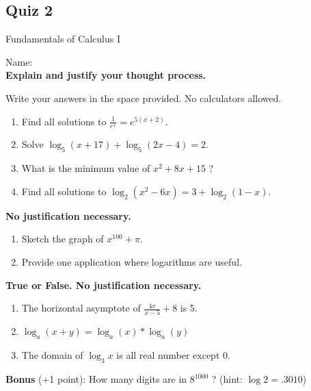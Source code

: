 \documentclass[a4paper, 12pt]{article}
\title{}
\date{}
\newcommand{\bt}[1]{\textbf{#1}} %
\begin{document}
\begin{center}
\section*{Quiz 2}
Fundamentals of Calculus I
\end{center}

Name: \underline{\hspace{5cm}} \\

\bt{Explain and justify your thought process.}

Write your answers in the space provided. No calculators allowed.

\begin{enumerate}
    \item Find all solutions to $\frac{1}{e^x} = e^{5(x+2)}$.
    \vspace{6cm}
    \item Solve $\log_5 (x+17) + \log_5 (2x-4) = 2$.
    \vspace{6cm}
    \item What is the minimum value of $x^2 + 8x + 15$ ?
    \vspace{6cm}
    \item Find all solutions to $\log_2 (x^2 - 6x) = 3 + \log_2 (1-x)$.
    \vspace{6cm}
\end{enumerate}


\bt{No justification necessary.}
\begin{enumerate}[resume]
    \item Sketch the graph of $x^{100} + \pi$.
    \vspace{5cm}
    \item Provide one application where logarithms are useful.
    \vspace{5cm}
\end{enumerate}

\bt{True or False. No justification necessary.}
\begin{enumerate}[resume]
    \item \underline{\hspace{1.5cm}} The horizontal asymptote of $\frac{4x}{x-5} + 8$ is 5.
    \item \underline{\hspace{1.5cm}} $\log_a (x + y) = \log_a (x) * \log_a (y)$
    \item \underline{\hspace{1.5cm}} The domain of $\log_3 x$  is all real number except 0. \\
\end{enumerate}

\bt{Bonus} (+1 point): How many digits are in $8^{1000}$ ? (hint: $\log 2 = .3010$) 
\end{document}
